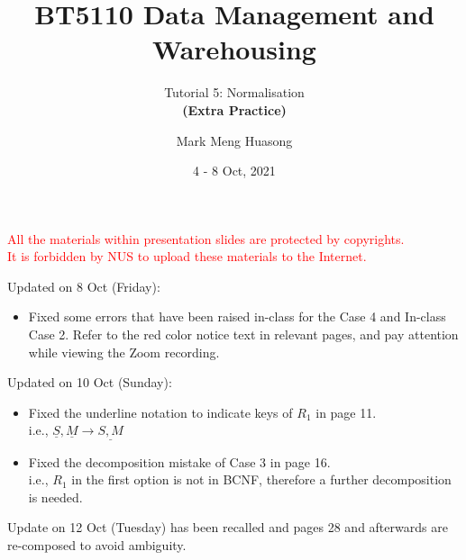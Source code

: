 
\title{BT5110 Data Management and Warehousing}

\subtitle{Tutorial 5: Normalisation\\ \textbf{(Extra Practice)}}

\author{Mark Meng Huasong}



\date{4 - 8 Oct, 2021}

\begin{frame}
	\titlepage
	\begin{tcolorbox}
		\begin{center}
			{\scriptsize \textcolor{red}{All the materials within presentation slides are protected by copyrights.\\
					It is forbidden by NUS to upload these materials to the Internet.}}
		\end{center}
	\end{tcolorbox}
\end{frame}

\begin{frame}
	Updated on 8 Oct (Friday):
	\begin{itemize}
		\item Fixed some errors that have been raised in-class for the Case 4 and In-class Case 2. Refer to the red color notice text in relevant pages, and pay attention while viewing the Zoom recording. 
	\end{itemize}
	Updated on 10 Oct (Sunday):
	\begin{itemize}
		\item Fixed the underline notation to indicate keys of $R_1$ in page 11.\\
		i.e., $\underline{S},\underline{M} \rightarrow\underline{S,M}$
		\item Fixed the decomposition mistake of Case 3 in page 16.\\
		i.e., $R_1$ in the first option is not in BCNF, therefore a further decomposition is needed. 
	\end{itemize}
	Update on 12 Oct (Tuesday) has been recalled and pages 28 and afterwards are re-composed to avoid ambiguity.
\end{frame}

